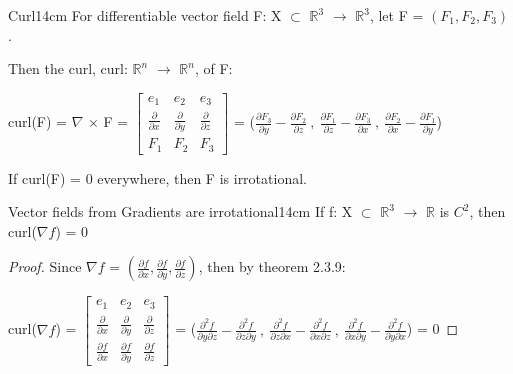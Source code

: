     \vspace{0.5cm}



    \begin{definition}{Curl}{14cm}
        For differentiable vector field F: X $\subset$ $\mathbb{R}^3$
        $\rightarrow$ $\mathbb{R}^3$, let F = $(F_1,F_2,F_3)$.

        Then the {\color{lblue} curl}, curl:
        $\mathbb{R}^n$ $\rightarrow$ $\mathbb{R}^n$, of F: 

        \hspace{0.5cm}
        curl(F)
        = $\nabla$ $\times$ F =
        $
        \begin{bmatrix}
            e_1 & e_2 & e_3 \\
            \frac{\partial}{\partial x} & \frac{\partial}{\partial y}
                & \frac{\partial}{\partial z} \\
            F_1 & F_2 & F_3
        \end{bmatrix}
        $
        = ($\frac{\partial F_3}{\partial y}-\frac{\partial F_2}{\partial z} \ , \
            \frac{\partial F_1}{\partial z}-\frac{\partial F_3}{\partial x} \ , \
            \frac{\partial F_2}{\partial x}-\frac{\partial F_1}{\partial y}$)

        If curl(F) = 0 everywhere, then F is irrotational.
    \end{definition}

    \vspace{0.5cm}



    \begin{wtheorem}{Vector fields from Gradients are irrotational}{14cm}
        If f: X $\subset$ $\mathbb{R}^3$ $\rightarrow$ $\mathbb{R}$
        is $C^2$, then curl($\nabla f$) = 0
    \end{wtheorem}

    \begin{proof}
        Since $\nabla f$
        = $(\frac{\partial f}{\partial x},
            \frac{\partial f}{\partial y},
            \frac{\partial f}{\partial z})$,
        then by {\color{red} theorem 2.3.9}:

        \hspace{0.5cm}
        curl($\nabla f$) =
        $
        \begin{bmatrix}
            e_1 & e_2 & e_3 \\
            \frac{\partial}{\partial x} & \frac{\partial}{\partial y}
                & \frac{\partial}{\partial z} \\
            \frac{\partial f}{\partial x} & \frac{\partial f}{\partial y}
                & \frac{\partial f}{\partial z}
        \end{bmatrix}
        $
        = ($\frac{\partial^2 f}{\partial y\partial z}
                - \frac{\partial^2 f}{\partial z\partial y} \ , \
            \frac{\partial^2 f}{\partial z\partial x}
                - \frac{\partial^2 f}{\partial x\partial z} \ , \
            \frac{\partial^2 f}{\partial x\partial y}
                - \frac{\partial^2 f}{\partial y\partial x}$)
        = 0
    \end{proof}

